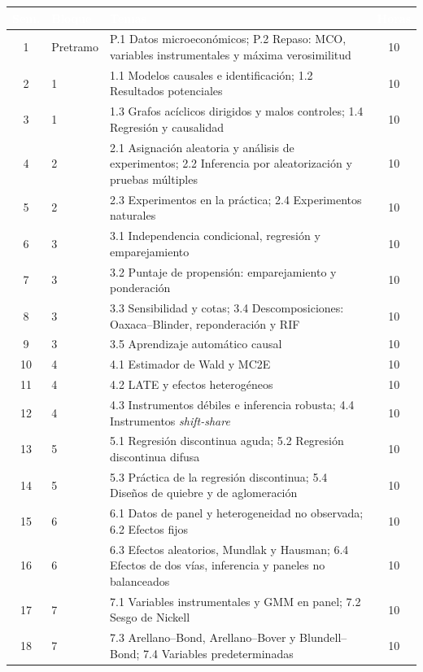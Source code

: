 \documentclass[11pt,a4paper]{article}
\renewcommand{\arraystretch}{1.3}
\newcommand{\cab}[1]{\textcolor{white}{\sffamily\bfseries #1}}
\newcommand{\filasalternas}{\rowcolors{2}{white}{tonoPalido}}
\begin{document}
{\small\filasalternas
\renewcommand{\arraystretch}{1.1}\noindent\begin{tabularx}{\textwidth}{clXc}
\toprule
\rowcolor{tonoOscuro}\cab{Sem.} & \cab{Bloque} & \cab{Temas} & \cab{Horas} \\
\midrule
1  & Pretramo & P.1 Datos microeconómicos; P.2 Repaso: MCO, variables instrumentales y máxima verosimilitud & 10 \\
\midrule
2  & 1 & 1.1 Modelos causales e identificación; 1.2 Resultados potenciales & 10 \\
3  & 1 & 1.3 Grafos acíclicos dirigidos y malos controles; 1.4 Regresión y causalidad & 10 \\
\midrule
4  & 2 & 2.1 Asignación aleatoria y análisis de experimentos; 2.2 Inferencia por aleatorización y pruebas múltiples & 10 \\
5  & 2 & 2.3 Experimentos en la práctica; 2.4 Experimentos naturales & 10 \\
\midrule
6  & 3 & 3.1 Independencia condicional, regresión y emparejamiento & 10 \\
7  & 3 & 3.2 Puntaje de propensión: emparejamiento y ponderación & 10 \\
8  & 3 & 3.3 Sensibilidad y cotas; 3.4 Descomposiciones: Oaxaca--Blinder, reponderación y RIF & 10 \\
9  & 3 & 3.5 Aprendizaje automático causal & 10 \\
\midrule
10 & 4 & 4.1 Estimador de Wald y MC2E & 10 \\
11 & 4 & 4.2 LATE y efectos heterogéneos & 10 \\
12 & 4 & 4.3 Instrumentos débiles e inferencia robusta; 4.4 Instrumentos \emph{shift-share} & 10 \\
\midrule
13 & 5 & 5.1 Regresión discontinua aguda; 5.2 Regresión discontinua difusa & 10 \\
14 & 5 & 5.3 Práctica de la regresión discontinua; 5.4 Diseños de quiebre y de aglomeración & 10 \\
\midrule
15 & 6 & 6.1 Datos de panel y heterogeneidad no observada; 6.2 Efectos fijos & 10 \\
16 & 6 & 6.3 Efectos aleatorios, Mundlak y Hausman; 6.4 Efectos de dos vías, inferencia y paneles no balanceados & 10 \\
\midrule
17 & 7 & 7.1 Variables instrumentales y GMM en panel; 7.2 Sesgo de Nickell & 10 \\
18 & 7 & 7.3 Arellano--Bond, Arellano--Bover y Blundell--Bond; 7.4 Variables predeterminadas & 10 \\

\end{tabularx}}
\end{document}
